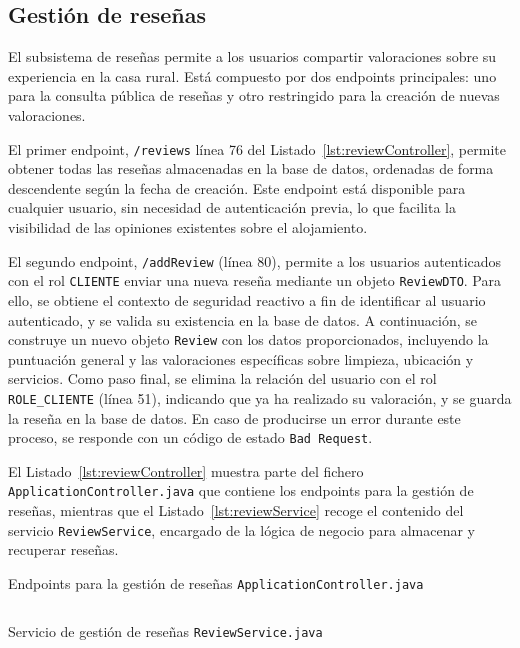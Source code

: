 \subsection{Gestión de reseñas}
El subsistema de reseñas permite a los usuarios compartir valoraciones sobre su experiencia en la casa rural. Está compuesto por dos endpoints principales: uno para la consulta pública de reseñas y otro restringido para la creación de nuevas valoraciones.

El primer endpoint, \texttt{/reviews} línea 76 del Listado~\ref{lst:reviewController}, permite obtener todas las reseñas almacenadas en la base de datos, ordenadas de forma descendente según la fecha de creación. Este endpoint está disponible para cualquier usuario, sin necesidad de autenticación previa, lo que facilita la visibilidad de las opiniones existentes sobre el alojamiento.

El segundo endpoint, \texttt{/addReview} (línea 80), permite a los usuarios autenticados con el rol \texttt{CLIENTE} enviar una nueva reseña mediante un objeto \texttt{ReviewDTO}. Para ello, se obtiene el contexto de seguridad reactivo a fin de identificar al usuario autenticado, y se valida su existencia en la base de datos. A continuación, se construye un nuevo objeto \texttt{Review} con los datos proporcionados, incluyendo la puntuación general y las valoraciones específicas sobre limpieza, ubicación y servicios. Como paso final, se elimina la relación del usuario con el rol \texttt{ROLE\_CLIENTE} (línea 51), indicando que ya ha realizado su valoración, y se guarda la reseña en la base de datos. En caso de producirse un error durante este proceso, se responde con un código de estado \texttt{Bad Request}.

El Listado~\ref{lst:reviewController} muestra parte del fichero \texttt{ApplicationController.java} que contiene los endpoints para la gestión de reseñas, mientras que el Listado~\ref{lst:reviewService} recoge el contenido del servicio \texttt{ReviewService}, encargado de la lógica de negocio para almacenar y recuperar reseñas.

\begin{longlisting} 
    \caption{Endpoints para la gestión de reseñas {\tt ApplicationController.java}} 
    \inputminted[firstline=75,lastline=85]{java}{../backend/elrincondeeva/elrincondeeva/src/main/java/es/uv/hemal/elrincondeeva/endpoints/ApplicationController.java} 
    \label{lst:reviewController} 
\end{longlisting}

\begin{longlisting}
    \caption{Servicio de gestión de reseñas {\tt ReviewService.java}}
    \inputminted[firstline=18]{java}{../backend/elrincondeeva/elrincondeeva/src/main/java/es/uv/hemal/elrincondeeva/services/ReviewService.java}
    \label{lst:reviewService}
\end{longlisting}


